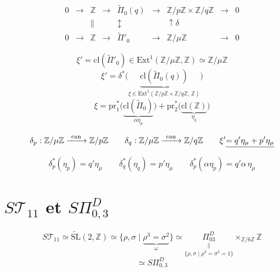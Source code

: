 \documentclass[11pt,a4paper]{article}
\begin{document}
\[
\begin{array}{ccccccccc}
0 & \to & \mathbb{Z} & \to & \widetilde\Pi_0(q) & \to & \mathbb{Z}/p\mathbb{Z} \times \mathbb{Z}/q\mathbb{Z} & \to & 0 \\
 & & \parallel & & \updownarrow & & \uparrow{\scriptstyle\delta} & & \\
0 & \to & \mathbb{Z} & \to & \widetilde\Pi'_0 & \longrightarrow & \mathbb{Z}/\mu\mathbb{Z} & \to & 0
\end{array}
\]

\[
\xi' = \mathrm{cl}(\widetilde\Pi'_0) \in
\mathrm{Ext}^1(\mathbb{Z}/\mu\mathbb{Z}, \mathbb{Z}) \simeq \mathbb{Z}/\mu\mathbb{Z}
\]
\[
\xi' = \delta^{*}\bigl(\underbrace{\mathrm{cl}(\widetilde\Pi_0(q))}_{\xi \in
\mathrm{Ext}^1(\mathbb{Z}/p\mathbb{Z} \times \mathbb{Z}/q\mathbb{Z},\, \mathbb{Z})}\bigr)
\]
\[
\xi = \mathrm{pr}_1^{*}\bigl(\underbrace{\mathrm{cl}(\widetilde\Pi_0)}_{\alpha\eta_p}\bigr)
+ \mathrm{pr}_2^{*}\bigl(\underbrace{\mathrm{cl}(\mathbb{Z})}_{\eta_q}\bigr)
\]


\[
\delta_p : \mathbb{Z}/\mu\mathbb{Z} \xrightarrow{\ \mathrm{can}\ } \mathbb{Z}/p\mathbb{Z}
\qquad
\delta_q : \mathbb{Z}/\mu\mathbb{Z} \xrightarrow{\ \mathrm{can}\ } \mathbb{Z}/q\mathbb{Z}
\qquad
\xi' \struck{= q'\eta_\mu + p'\eta_\mu}
\]
\[
\delta_p^{*}(\eta_p) = q'\eta_\mu
\qquad
\delta_q^{*}(\eta_q) = p'\eta_\mu
\qquad
\delta_p^{*}(\alpha\eta_p) = q'\alpha\,\eta_\mu
\]

\section{$S\mathcal{T}_{11}$ et $S\Pi^{D}_{0,3}$}




\[
S\mathcal{T}_{11} \simeq \widetilde{\mathrm{SL}}(2, \mathbb{Z})
\simeq \{\rho, \sigma \mid \underbrace{\rho^3 = \sigma^2}_{\omega}\}
\simeq \underset{\{\rho, \sigma \mid \rho^3 = \sigma^2 = 1\}}{\underset{\parallel}{\Pi^{D}_{03}}}
\times_{\mathbb{Z}/6\mathbb{Z}} \mathbb{Z}
\]
\[
\simeq S\Pi^{D}_{0,3}
\]
\end{document}
